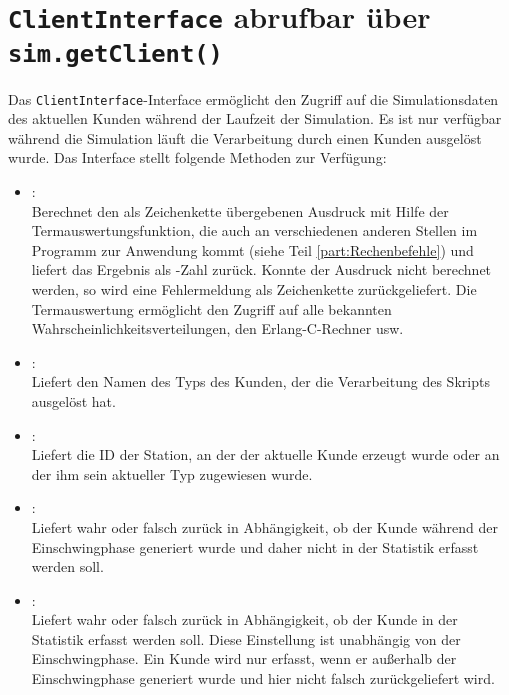 \chapter{\texttt{ClientInterface} abrufbar über \texttt{sim.getClient()}}

Das \texttt{ClientInterface}-Interface ermöglicht den Zugriff auf die Simulationsdaten des aktuellen Kunden während
der Laufzeit der Simulation. Es ist nur verfügbar während die Simulation läuft die Verarbeitung durch
einen Kunden ausgelöst wurde. Das Interface stellt folgende Methoden zur Verfügung:

\begin{itemize}

\item
{}:\\
Berechnet den als Zeichenkette übergebenen Ausdruck mit Hilfe der Termauswertungsfunktion, die
auch an verschiedenen anderen Stellen im Programm zur Anwendung kommt (siehe Teil \ref{part:Rechenbefehle}) und liefert das Ergebnis
als -Zahl zurück. Konnte der Ausdruck nicht berechnet werden, so wird eine Fehlermeldung als
Zeichenkette zurückgeliefert. Die Termauswertung ermöglicht den Zugriff auf alle bekannten
Wahrscheinlichkeitsverteilungen, den Erlang-C-Rechner usw.

\item
{}:\\
Liefert den Namen des Typs des Kunden, der die Verarbeitung des Skripts ausgelöst hat.

\item
{}:\\
Liefert die ID der Station, an der der aktuelle Kunde erzeugt wurde oder an der ihm sein aktueller Typ zugewiesen wurde.

\item
{}:\\
Liefert wahr oder falsch zurück in Abhängigkeit, ob der Kunde während der Einschwingphase generiert wurde und
daher nicht in der Statistik erfasst werden soll.
  
\item
{}:\\
Liefert wahr oder falsch zurück in Abhängigkeit, ob der Kunde in der Statistik erfasst werden soll.
Diese Einstellung ist unabhängig von der Einschwingphase. Ein Kunde wird nur erfasst, wenn er außerhalb
der Einschwingphase generiert wurde und hier nicht falsch zurückgeliefert wird.
  

\end{itemize}
